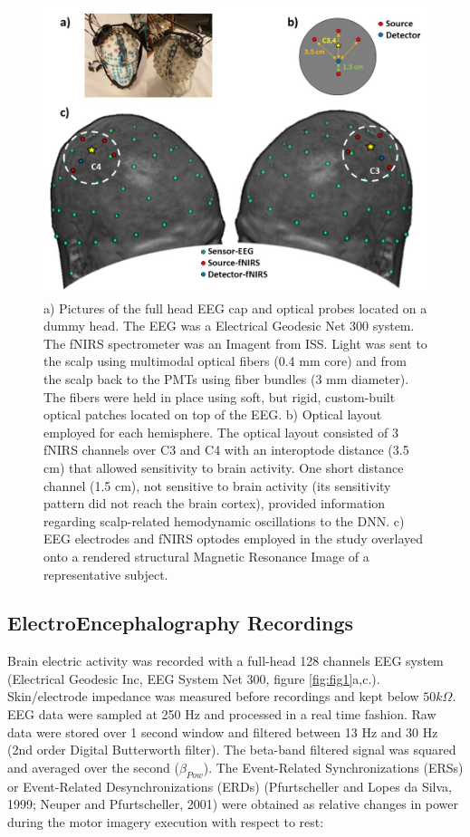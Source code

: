 \documentclass[12pt ]{iopart}
\begin{document}
\begin{figure}
	\includegraphics[width=\linewidth]{Slide2.JPG}
	\caption{a) Pictures of the full head EEG cap and optical probes located on a dummy head. The EEG was a Electrical Geodesic Net 300 system. The fNIRS spectrometer was an Imagent from ISS. Light was sent to the scalp using multimodal optical fibers (0.4 mm core) and from the scalp back to the PMTs using fiber bundles (3 mm diameter).  The fibers were held in place using soft, but rigid, custom-built optical patches located on top of the EEG. b) Optical layout employed for each hemisphere. The optical layout consisted of 3 fNIRS channels over C3 and C4 with an interoptode distance (3.5 cm) that allowed sensitivity to brain activity. One short distance channel (1.5 cm),  not sensitive to brain activity (its sensitivity pattern did not reach the brain cortex), provided information regarding scalp-related hemodynamic oscillations to the DNN. c) EEG electrodes and fNIRS optodes employed in the study overlayed onto a rendered structural Magnetic Resonance Image of a representative subject. }
	\label{fig:fig2}
\end{figure}


\subsection{ElectroEncephalography Recordings}
Brain electric activity was recorded with a full-head 128 channels EEG system (Electrical Geodesic Inc, EEG System Net 300, figure \ref{fig:fig1}a,c.).
Skin/electrode impedance was measured before recordings and kept below $50 k\Omega$. EEG data were sampled at 250 Hz and processed in a real time fashion.  Raw data were stored over 1 second window and filtered between 13 Hz and 30 Hz (2nd order Digital Butterworth filter). The beta-band filtered signal was squared and averaged over the second ($\beta_{Pow}$).
 The Event-Related Synchronizations (ERSs) or Event-Related Desynchronizations (ERDs) (Pfurtscheller and Lopes da Silva, 1999; Neuper and Pfurtscheller, 2001) were obtained as relative changes in power during the motor imagery execution with respect to rest:
\end{document}
